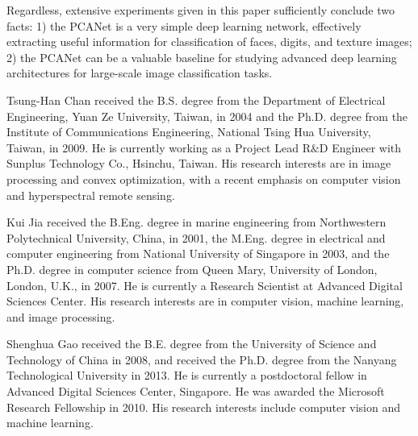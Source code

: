 \documentclass[10pt,journal,compsoc]{IEEEtran}
\begin{document}
Regardless, extensive experiments given in this paper sufficiently conclude two facts: 1) the PCANet is a very simple deep learning network, effectively extracting useful information for classification of faces, digits, and texture images; 2) the PCANet can be a valuable baseline for studying advanced deep learning architectures for large-scale image classification tasks.





\begin{IEEEbiography}
{Tsung-Han Chan} received the B.S. degree from the Department of Electrical Engineering, Yuan Ze University, Taiwan, in 2004
and the Ph.D. degree from the Institute of Communications Engineering, National Tsing Hua University, Taiwan, in 2009. He is currently working as a Project Lead R$\&$D Engineer with Sunplus Technology Co., Hsinchu, Taiwan. His research interests are in image processing and convex optimization, with a recent emphasis on computer vision and hyperspectral remote sensing.
\end{IEEEbiography}


\begin{IEEEbiography}
{Kui Jia} received the B.Eng. degree in marine engineering from Northwestern Polytechnical University, China, in 2001, the M.Eng. degree in electrical and computer engineering from National University of Singapore in 2003, and the Ph.D. degree in computer science from Queen Mary, University of London, London, U.K., in 2007. He is currently a Research Scientist at Advanced Digital Sciences Center. His research interests are in computer vision, machine learning, and image processing.
\end{IEEEbiography}



\begin{IEEEbiography}
{Shenghua Gao} received the B.E. degree from the University of Science and Technology of China in 2008, and received the Ph.D. degree from the Nanyang Technological University in 2013. He is currently a postdoctoral fellow in Advanced Digital Sciences Center, Singapore. He was awarded the Microsoft Research Fellowship in 2010. His research interests include computer vision and machine learning.
\end{IEEEbiography}
\end{document}

